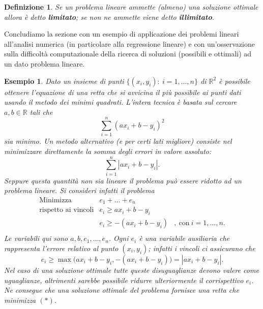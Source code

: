 \documentclass[italian, 12pt, reqno]{article}
\theoremstyle{myteo}
\newtheorem{definition}[theorem]{Definizione}
\newtheorem{example}[theorem]{Esempio}
\numberwithin{equation}{section}
\begin{document}
\begin{definition}
  \label{def:problemi_limitati_e_illimitati}
  Se un problema lineare ammette (almeno) una soluzione ottimale allora è detto \textbf{limitato}; se non ne ammette viene detto \textbf{illimitato}.
\end{definition}

Concludiamo la sezione con un esempio di applicazione dei problemi lineari all'analisi numerica (in particolare alla regressione lineare) e con un'osservazione sulla difficoltà computazionale della ricerca di soluzioni (possibili e ottimali) ad un dato problema lineare.

\begin{example}
  \label{es:minimi_quadrati}
  Dato un insieme di punti \(\{(x_i, y_i)\colon\ i=1,\ldots,n\}\) di \(\mathbb{R}^2\) è possibile ottenere l'equazione di una retta che si avvicina il più possibile ai punti dati usando il \textit{metodo dei minimi quadrati}.
  L'intera tecnica è basata sul cercare \(a,b\in\mathbb{R}\) tali che
  \begin{equation*}
    \sum_{i=1}^n(ax_i + b - y_i)^2
  \end{equation*}
  sia minimo. Un metodo alternativo (e per certi lati migliore) consiste nel minimizzare direttamente la somma degli errori in valore assoluto:
  \begin{equation*}
    \tag{\(*\)}
    \sum_{i=1}^n|ax_i + b - y_i|.
  \end{equation*}
  Seppure questa quantità non sia lineare il problema può essere ridotto ad un problema lineare.
  Si consideri infatti il problema
  \begin{equation*}
    \begin{array}{lll}
      \text{Minimizza} & e_1 + \ldots + e_n &\\
      \text{rispetto ai vincoli} & e_i\geq ax_i + b - y_i &\\
                       & e_i\geq -(ax_i + b - y_i) &,\ \text{con}\ i = 1,\ldots, n.\\
    \end{array}
  \end{equation*}
  Le variabili qui sono \(a, b, e_1,\ldots, e_n\).
  Ogni \(e_i\) è una variabile ausiliaria che rappresenta l'errore relativo al punto \((x_i, y_i)\); infatti i vincoli ci assicurano che
  \[e_i\geq\max\big(ax_i + b - y_i, -(ax_i + b - y_i)\big) = |ax_i + b - y_i|.\]
  Nel caso di una soluzione ottimale tutte queste disuguaglianze devono valere come uguaglianze, altrimenti sarebbe possibile ridurre ulteriormente il corrispettivo \(e_i\).
  Ne consegue che una soluzione ottimale del problema fornisce una retta che minimizza \((*)\).
\end{example}
\end{document}
